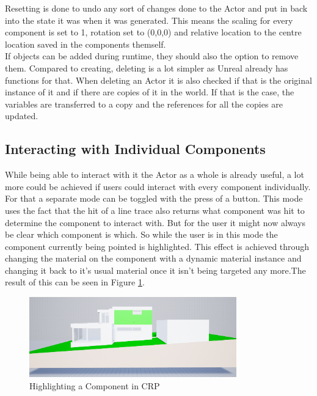 Resetting is done to undo any sort of changes done to the Actor and put in back into the state it was when it was generated. This means the scaling for every component is set to 1, rotation set to (0,0,0) and relative location to the centre location saved in the components themself.\\
If objects can be added during runtime, they should also the option to remove them. Compared to creating, deleting is a lot simpler as Unreal already has functions for that. When deleting an Actor it is also checked if that is the original instance of it and if there are copies of it in the world. If that is the case, the variables are transferred to a copy and the references for all the copies are updated.\\

\subsection{Interacting with Individual Components}

While being able to interact with it the Actor as a whole is already useful, a lot more could be achieved if users could interact with every component individually. For that a separate mode can be toggled with the press of a button. This mode uses the fact that the hit of a line trace also returns what component was hit to determine the component to interact with. But for the user it might now always be clear which component is which. So while the user is in this mode the component currently being pointed is highlighted. This effect is achieved through changing the material on the component with a dynamic material instance and changing it back to it's usual material once it isn't being targeted any more.The result of this can be seen in Figure \ref{fig:ComponentHighlight}.\\

\begin{figure}[htpb]
	\centering
	\includegraphics[width=0.8\textwidth]{fig/ComponentHighlight.png}
	\caption[Highlighting a Component in CRP]{Highlighting a Component in CRP\protect}
	\label{fig:ComponentHighlight}
\end{figure}

